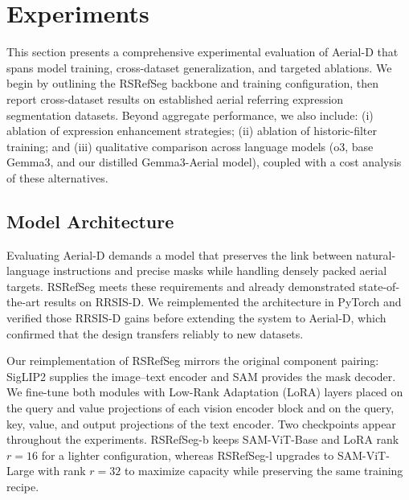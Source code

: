
\section{Experiments}
\label{sec:experiments}

This section presents a comprehensive experimental evaluation of Aerial-D that spans model training, cross-dataset generalization, and targeted ablations. We begin by outlining the RSRefSeg backbone and training configuration, then report cross-dataset results on established aerial referring expression segmentation datasets. Beyond aggregate performance, we also include: (i) ablation of expression enhancement strategies; (ii) ablation of historic-filter training; and (iii) qualitative comparison across language models (o3, base Gemma3, and our distilled Gemma3-Aerial model), coupled with a cost analysis of these alternatives.

\subsection{Model Architecture}
\label{subsec:model_architecture}

Evaluating Aerial-D demands a model that preserves the link between natural-language instructions and precise masks while handling densely packed aerial targets. RSRefSeg meets these requirements and already demonstrated state-of-the-art results on RRSIS-D\cite{liu2024rotated}. We reimplemented the architecture in PyTorch and verified those RRSIS-D gains before extending the system to Aerial-D, which confirmed that the design transfers reliably to new datasets.

Our reimplementation of RSRefSeg\cite{chen2025rsrefseg} mirrors the original component pairing: SigLIP2\cite{siglip2} supplies the image–text encoder and SAM\cite{sam} provides the mask decoder. We fine-tune both modules with Low-Rank Adaptation (LoRA)\cite{lora} layers placed on the query and value projections of each vision encoder block and on the query, key, value, and output projections of the text encoder. Two checkpoints appear throughout the experiments. RSRefSeg-b keeps SAM-ViT-Base and LoRA rank $r=16$ for a lighter configuration, whereas RSRefSeg-l upgrades to SAM-ViT-Large with rank $r=32$ to maximize capacity while preserving the same training recipe.

